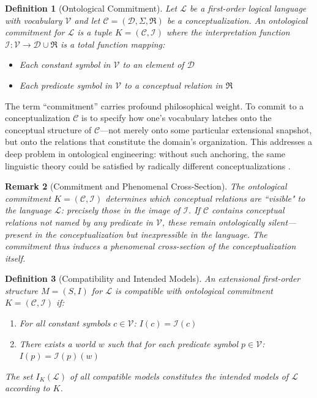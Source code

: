 \documentclass[12pt,a4paper]{article}
\newtheorem{definition}{Definition}[section]
\newtheorem{remark}[definition]{Remark}
\newcommand{\domain}{\mathcal{D}}
\newcommand{\vocab}{\mathcal{V}}
\newcommand{\lang}{\mathcal{L}}
\newcommand{\interp}{\mathcal{I}}
\newcommand{\concept}{\mathcal{C}}
\newcommand{\intrel}{\mathfrak{R}}
\begin{document}
\begin{definition}[Ontological Commitment]
Let $\lang$ be a first-order logical language with vocabulary $\vocab$ and let $\concept = (\domain, \Sigma, \intrel)$ be a conceptualization. An \emph{ontological commitment} for $\lang$ is a tuple $K = (\concept, \interp)$ where the \emph{interpretation function} $\interp : \vocab \to \domain \cup \intrel$ is a total function mapping:
\begin{itemize}
    \item Each constant symbol in $\vocab$ to an element of $\domain$
    \item Each predicate symbol in $\vocab$ to a conceptual relation in $\intrel$
\end{itemize}
\end{definition}

The term ``commitment'' carries profound philosophical weight. To commit to a conceptualization $\concept$ is to specify how one's vocabulary latches onto the conceptual structure of $\concept$---not merely onto some particular extensional snapshot, but onto the relations that constitute the domain's organization. This addresses a deep problem in ontological engineering: without such anchoring, the same linguistic theory could be satisfied by radically different conceptualizations \citep{guarino2009}.

\begin{remark}[Commitment and Phenomenal Cross-Section]
The ontological commitment $K = (\concept, \interp)$ determines which conceptual relations are ``visible" to the language $\lang$: precisely those in the image of $\interp$. If $\concept$ contains conceptual relations not named by any predicate in $\vocab$, these remain ontologically silent---present in the conceptualization but inexpressible in the language. The commitment thus induces a phenomenal cross-section of the conceptualization itself.
\end{remark}

\begin{definition}[Compatibility and Intended Models]
An extensional first-order structure $M = (S, I)$ for $\lang$ is \emph{compatible with} ontological commitment $K = (\concept, \interp)$ if:
\begin{enumerate}
    \item For all constant symbols $c \in \vocab$: $I(c) = \interp(c)$
    \item There exists a world $w$ such that for each predicate symbol $p \in \vocab$: $I(p) = \interp(p)(w)$
\end{enumerate}
The set $I_K(\lang)$ of all compatible models constitutes the \emph{intended models of $\lang$ according to $K$}.
\end{definition}
\end{document}
